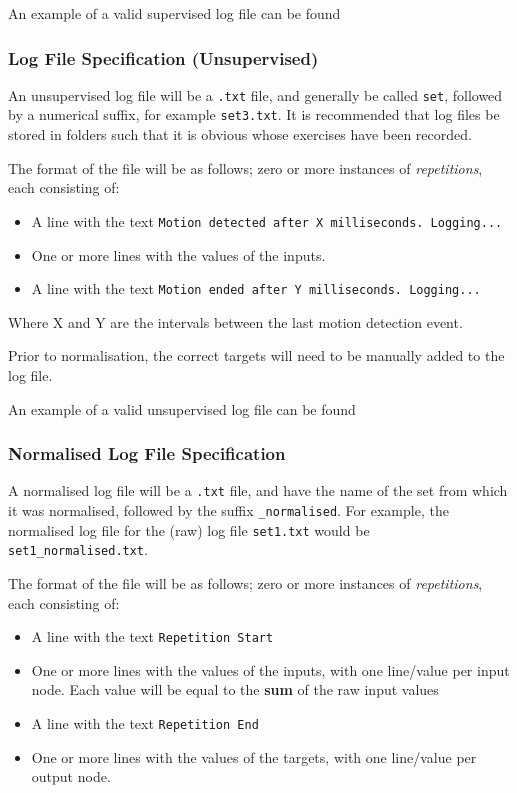 \documentclass[a4paper]{article}
\begin{document}
An example of a valid supervised log file can be found 

\subsubsection{Log File Specification (Unsupervised)}

An unsupervised log file will be a \lstinline{.txt} file, and generally be called \lstinline{set}, followed by a numerical suffix, for example \lstinline{set3.txt}. It is recommended that log files be stored in folders such that it is obvious whose exercises have been recorded.

The format of the file will be as follows; zero or more instances of \emph{repetitions}, each consisting of:

\begin{itemize}
\item A line with the text \lstinline{Motion detected after X milliseconds. Logging...}
\item One or more lines with the values of the inputs.
\item A line with the text \lstinline{Motion ended after Y milliseconds. Logging...}
\end{itemize}

Where X and Y are the intervals between the last motion detection event.

Prior to normalisation, the correct targets will need to be manually added to the log file.

An example of a valid unsupervised log file can be found 

\subsubsection{Normalised Log File Specification}

A normalised log file will be a \lstinline{.txt} file, and have the name of the set from which it was normalised, followed by the suffix \lstinline{_normalised}. For example, the normalised log file for the (raw) log file \lstinline{set1.txt} would be \lstinline{set1_normalised.txt}.

The format of the file will be as follows; zero or more instances of \emph{repetitions}, each consisting of:
\begin{itemize}
\item A line with the text \lstinline{Repetition Start}
\item One or more lines with the values of the inputs, with one line/value per input node. Each value will be equal to the \textbf{sum} of the raw input values
\item A line with the text \lstinline{Repetition End}
\item One or more lines with the values of the targets, with one line/value per output node.
\end{itemize}
\end{document}
